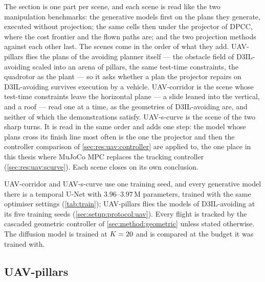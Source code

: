 The section is one part per scene, and each scene is read like the two manipulation benchmarks: the
generative models first on the plans they generate, executed without projection; the same cells then under
the projector of \ac{DPCC}, where the cost frontier and the flown paths are; and the two projection methods
against each other last. The scenes come in the order of what they add. UAV-pillars flies the plans of the avoiding planner itself
--- the obstacle field of D3IL-avoiding scaled into an arena of pillars, the same test-time constraints, the
quadrotor as the plant --- so it asks whether a plan the projector repairs on D3IL-avoiding survives execution
by a vehicle. UAV-corridor is the scene whose test-time constraints leave the horizontal plane --- a slide leaned into
the vertical, and a roof --- read one at a time, as the geometries of D3IL-avoiding are, and neither of
which the demonstrations satisfy.
UAV-s-curve is the scene of the two sharp turns. It is read in the same order and adds one step: the model
whose plans cross its finish line most often is the one the projector and then the controller comparison
of \autoref{sec:res:uav:controller} are applied to, the one place in this thesis where MuJoCo MPC replaces
the tracking controller (\autoref{sec:res:uav:scurve}). Each scene closes on its own conclusion.

UAV-corridor and UAV-s-curve use one training seed, and every generative model there is a temporal U-Net
with $3.96$--$3.97$\,M parameters, trained with the same optimiser settings (\autoref{tab:train});
UAV-pillars flies the models of D3IL-avoiding at its five training seeds (\autoref{sec:setup:protocol:uav}).
Every flight is tracked by the cascaded geometric controller of \autoref{sec:method:geometric} unless
stated otherwise. The diffusion
model is trained at $K=20$ and is compared at the budget it was trained with.

\subsection{UAV-pillars}\label{sec:res:uav:pillars}

